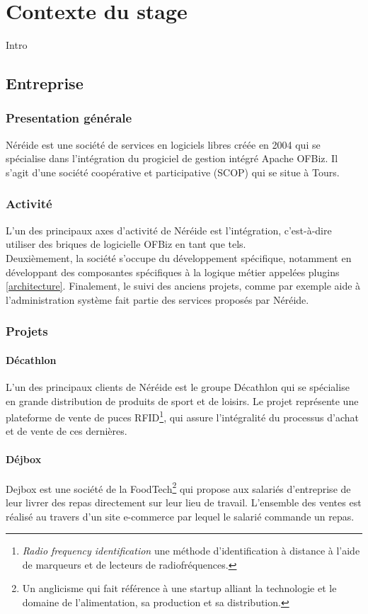 \chapter{Contexte du stage}

Intro

\section{Entreprise}

\subsection{Presentation générale }
Néréide est une société de services en logiciels libres créée en 2004 qui se spécialise dans l'intégration du progiciel de gestion intégré Apache OFBiz. Il s'agit d'une société coopérative et participative (SCOP) qui se situe à Tours. 



\subsection{Activité}
\label{activite}


L'un des principaux axes d'activité de Néréide est l'intégration, c'est-à-dire utiliser des briques de logicielle OFBiz en tant que tels. \\
Deuxièmement, la société s'occupe du développement spécifique, notamment en développant des composantes spécifiques à la logique métier appelées plugins \ref{architecture}. 
Finalement, le suivi des anciens projets, comme par exemple aide à l'administration système fait partie des services proposés par Néréide. 
\subsection{Projets}
\subsubsection{Décathlon}
L'un des principaux clients de Néréide est le groupe Décathlon qui se spécialise en grande distribution de produits de sport et de loisirs. 
Le projet représente une plateforme de vente de puces RFID\footnote{\emph{Radio frequency identification} une méthode d'identification à distance à l'aide de marqueurs et de lecteurs de radiofréquences.}, qui assure l'intégralité du processus d'achat et de vente de ces dernières.

\subsubsection{Déjbox}
\label{dejbox}
Dejbox est une société de la FoodTech\footnote{Un anglicisme qui fait référence à une startup alliant la technologie et le domaine de l’alimentation, sa production et sa distribution.} qui propose aux salariés d’entreprise de leur livrer des repas directement sur leur lieu de travail. L’ensemble des ventes est réalisé au travers d’un site e-commerce par lequel le salarié commande un repas.

